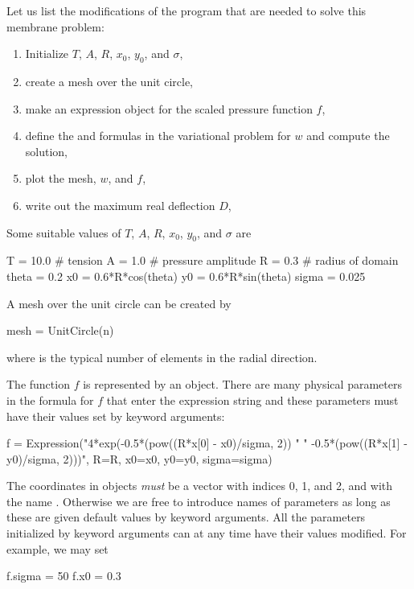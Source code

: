 Let us list the modifications of the
 program that are needed to solve this membrane problem:
\begin{enumerate}
  \item Initialize $T$, $A$, $R$, $x_0$, $y_0$, and $\sigma$,

  \item create a mesh over the unit circle,

  \item make an expression object for the scaled pressure function $f$,

  \item define the  and  formulas in the variational
  problem for $w$ and compute the solution,

  \item plot the mesh, $w$, and $f$,

  \item write out the maximum real deflection $D$,
\end{enumerate}

\vfill\pagebreak

\noindent
Some suitable values of $T$, $A$, $R$, $x_0$, $y_0$, and $\sigma$ are
\begin{python}
T = 10.0  # tension
A = 1.0   # pressure amplitude
R = 0.3   # radius of domain
theta = 0.2
x0 = 0.6*R*cos(theta)
y0 = 0.6*R*sin(theta)
sigma = 0.025
\end{python}

A mesh over the unit circle can be created by
\begin{python}
mesh = UnitCircle(n)
\end{python}
where  is the typical number of elements in the radial direction.

The function $f$ is represented by an  object. There
are many physical parameters in the formula for $f$ that enter
the expression string and these parameters must have their values set
by keyword arguments:
\begin{python}
f = Expression("4*exp(-0.5*(pow((R*x[0] - x0)/sigma, 2)) "
               "      -0.5*(pow((R*x[1] - y0)/sigma, 2)))",
               R=R, x0=x0, y0=y0, sigma=sigma)
\end{python}
The coordinates in  objects \emph{must} be a vector
with indices 0, 1, and 2, and with the name . Otherwise
we are free to introduce names of parameters as long as these are
given default values by keyword arguments. All the parameters
initialized by keyword arguments can at any time have their
values modified. For example, we may set
\begin{python}
f.sigma = 50
f.x0 = 0.3
\end{python}

